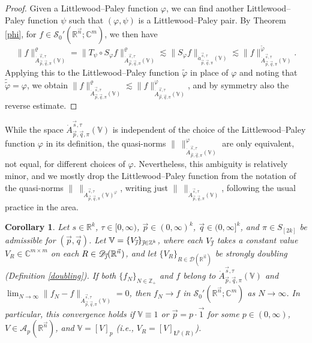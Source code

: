 \documentclass[11pt, reqno]{amsart}
\newtheorem{corollary}[theorem]{Corollary}
\theoremstyle{definition}
\theoremstyle{remark}
\numberwithin{equation}{section}
\newcommand{\A}{\mathscr A}
\newcommand{\C}{\mathbb C}
\newcommand{\D}{\mathscr D}
\newcommand{\R}{\mathbb R}
\newcommand{\Sc}{\mathscr S}
\newcommand{\V}{\mathbb V}
\newcommand{\Z}{\mathbb Z}
\newcommand{\vj}{\vec{\textit{\j}}}
\newcommand{\vn}{\vec n}
\newcommand{\vp}{\vec p}
\newcommand{\vq}{\vec q}
\newcommand{\vs}{\vec s}
\newcommand{\Atau}{\dot A^{\vs,\tau}_{\vp,\vq,\pi}}
\newcommand{\atau}{\dot a^{\vs,\tau}_{\vp,\vq,\pi}}
\newcommand{\aveL}{\textit{\L}}
\newcommand{\Norm}[2]{\|#1\|_{#2}}
\begin{document}
\begin{proof}
Given a Littlewood--Paley function $\varphi$, we can find another Littlewood--Paley function $\psi$ such that $(\varphi,\psi)$ is a Littlewood--Paley pair.
By Theorem \ref{phi}, for $f\in\Sc_0'(\R^{\vn};\C^m)$, we then have
\begin{equation*}
\Norm{f}{\Atau(\V)}^{\varrho}
=\Norm{T_\psi\circ S_\varphi f}{\Atau(\V)}^{\varrho}
\lesssim\Norm{S_\varphi f}{\atau(\V)}
\lesssim\Norm{f}{\Atau(\V)}^{\widetilde\varphi}.
\end{equation*}
Applying this to the Littlewood--Paley function $\widetilde\varphi$ in place of $\varphi$ and noting that $\widetilde{\widetilde{\varphi}}=\varphi$, we obtain $\Norm{f}{\Atau(\V)}^{\varrho} \lesssim\Norm{f}{\Atau(\V)}^{\varphi}$, and by symmetry also the reverse estimate.
\end{proof}

While the space $\Atau(\V)$ is independent of the choice of the Littlewood--Paley function $\varphi$ in its definition, the quasi-norms $\Norm{\ }{\Atau(\V)}^{\varphi}$ are only equivalent, not equal, for different choices of $\varphi$. Nevertheless, this ambiguity is relatively minor, and we mostly drop the Littlewood--Paley function from the notation of the quasi-norms $\Norm{\ }{\Atau(\V)^{\varphi}}$, writing just $\Norm{\ }{\Atau(\V)}$, following the usual practice in the area.

\begin{corollary}\label{convergence}
Let $s\in\R^k$, $\tau\in[0,\infty)$, $\vp\in(0,\infty)^k$, $\vq\in(0,\infty]^k$, and $\pi\in S_{[2k]}$ be admissible for $(\vp,\vq)$.
Let $\V=\{V_{\vj}\}_{\vj\in\Z^k}$, where each $V_{\vj}$ takes a constant value $V_R\in\C^{m\times m}$ on each $R\in\D_{\vj}(\R^{\vn})$, and let $\{V_R\}_{R\in\D(\R^{\vn})}$ be strongly doubling (Definition \ref{doubling}).
If both $\{f_N\}_{N\in\Z_+}$ and $f$ belong to $\Atau(\V)$ and $\lim_{N\to\infty}\Norm{f_N-f}{\Atau(\V)}=0$,
then $f_N\to f$ in $\Sc_0'(\R^{\vn};\C^m)$ as $N\to\infty$.
In particular, this convergence holds
if $\V\equiv1$ or $\vp=p\cdot\vec1$ for some $p\in(0,\infty)$, $V\in\A_p(\R^{\vn})$,
and $\V=[V]_p$ (i.e., $V_R=[V]_{\aveL^p(R)}$).
\end{corollary}
\end{document}

